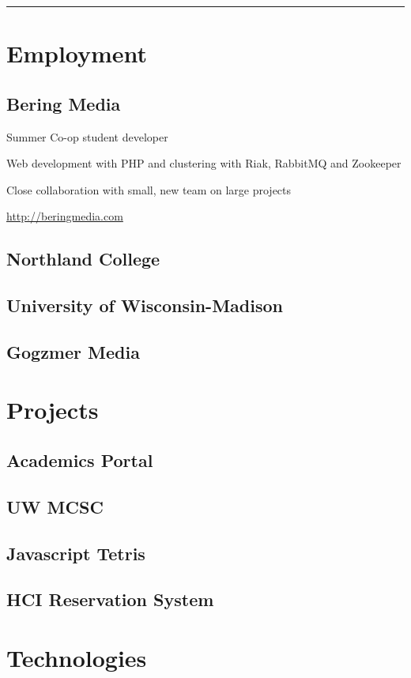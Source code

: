 \documentclass[letterpaper,11pt,notitlepage]{article}
\begin{document}

\rule{\linewidth}{0.25mm}
\section{Employment}
\subsection{Bering Media}
\begin{employment}
\item Summer Co-op student developer
\item Web development with PHP and clustering with Riak, RabbitMQ and
Zookeeper
\item Close collaboration with small, new team on large  projects
\item \url{http://beringmedia.com}
\end{employment}
\subsection{Northland College}
\subsection{University of Wisconsin-Madison}
\subsection{Gogzmer Media}
\section{Projects}
\subsection{Academics Portal}
\subsection{UW MCSC}
\subsection{Javascript Tetris}
\subsection{HCI Reservation System}

\section{Technologies}
\end{document}
